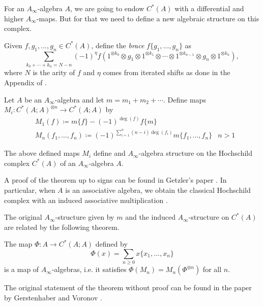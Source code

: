\documentclass[bibtex,babel-main=english]{TEMat-article}
\begin{document}
	For an $A_\infty$-algebra $A$, we are going to endow $C^*(A)$ with a differential and higher $A_\infty$-maps. But for that we need to define a new algebraic structure on this complex. 
	
Given $f,g_1,\dots, g_n\in C^*(A)$, define the \emph{brace} $f\{g_1,\dots, g_n\}$ as
\[\sum_{k_0+\cdots+k_n=N-n}(-1)^\eta f(1^{\otimes k_0}\otimes g_1\otimes 1^{\otimes k_1}\otimes\cdots\otimes 1^{\otimes k_{n-1}}\otimes g_n\otimes 1^{\otimes k_n}),\]
where $N$ is the arity of $f$ and $\eta$ comes from iterated shifts as done in the Appendix of \cite{R-W}. %

Let $A$ be an $A_\infty$-algebra and let $m=m_1+m_2+\cdots$.  Define maps $M_i:C^*(A;A)^{\otimes n}\to C^*(A;A)$ by
\begin{align*}
&M_1(f)\coloneqq m\{f\}-(-1)^{\deg(f)}f\{m\}\\ %
&M_n(f_1,\dots, f_n)\coloneqq (-1)^{\sum_{i=1}^n (n-i)\deg(f_i)}m\{f_1,\dots, f_n\} & n>1
\end{align*}

\begin{theorem}
The above defined maps $M_i$ define and $A_\infty$-algebra structure on the Hochschild complex $C^*(A)$ of an $A_\infty$-algebra $A$.
\end{theorem}

A proof of the theorem up to signs can be found in Getzler's paper \cite{getzler}.
In particular, when $A$ is an associative algebra, we obtain the classical Hochschild complex with an induced associative multiplication \cite{gerstenhaber}.

The original $A_\infty$-structure given by $m$ and the induced $A_\infty$-structure on $C^*(A)$ are related by the following theorem.
\begin{theorem}
The map $\Phi:A\to C^*(A;A)$ defined by \[\Phi(x)=\sum_{n\geq 0} x\{x_1,\dots, x_n\}\]
is a map of $A_\infty$-algebras, i.e. it satisfies $\Phi(M_n)=M_n(\Phi^{\otimes n})$ for all $n$.
\end{theorem}

The original statement of the theorem without proof can be found in the paper by Gerstenhaber and Voronov \cite{G-V}.
\printbibliography[heading=bibintoc]
\end{document}
